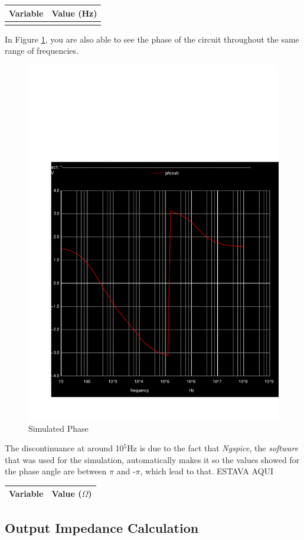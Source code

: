 \begin{center}
\begin{tabular}{|l|r|}
  \hline    
  {\bf Variable} & {\bf Value (Hz)} \\ \hline
  
  \label{tab:freq-tab}
\end{tabular}
\end{center}

In Figure \ref{fig:sim-phase}, you are also able to see the phase of the circuit throughout the same range of frequencies.

\begin{figure}[H] \centering
\includegraphics[width=0.5\linewidth]{../sim/phase.pdf}
\caption{Simulated Phase}
\label{fig:sim-phase}
\end{figure}

The discontinuance at around 10$^5$Hz is due to the fact that \textit{Ngspice}, the \textit{software} that was used for the simulation, automatically makes it so the values showed for the phase angle are between $\pi$ and -$\pi$, which lead to that. ESTAVA AQUI

\begin{center}
\begin{tabular}{|l|r|}
  \hline    
  {\bf Variable} & {\bf Value ($\Omega$)} \\ \hline
  
\end{tabular}
\end{center}

\subsection{Output Impedance Calculation}

